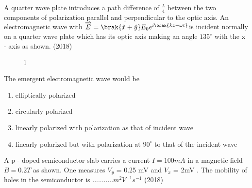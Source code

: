     \item A quarter wave plate introduces a path difference of $\frac{\lambda}{4}$ between the two components
    of polarization parallel and perpendicular to the optic axis. An electromagnetic wave with $\overrightarrow{E}=\brak{\hat{x}+\hat{y}}E_0e^{i\brak{kz-\omega t}}$is incident normally on a quarter wave plate which has its optic axis
    making an angle $135^{\circ}$ with the x - axis as shown.  \hfill (2018)
    \begin{figure}[!ht]
        \centering
        \caption{1}
    \end{figure}
    The emergent electromagnetic wave would be 
    \begin{enumerate}[label=(\Alph*)]
        \item elliptically polarized 
        \item circularly polarized 
        \item  linearly polarized with polarization as that of incident wave 
        \item  linearly polarized but with polarization at $90^{\circ}$ to that of the incident wave 
    \end{enumerate}
    \item  A p - doped semiconductor slab carries a current $I=100mA$ in a magnetic field
    $B = 0.2T$ as shown. One measures $V_y$ = 0.25 mV and $V_x$ = 2mV . The mobility of holes
    in the semiconductor is ...........$m^2V^{-1}s^{-1}$ \hfill (2018)
